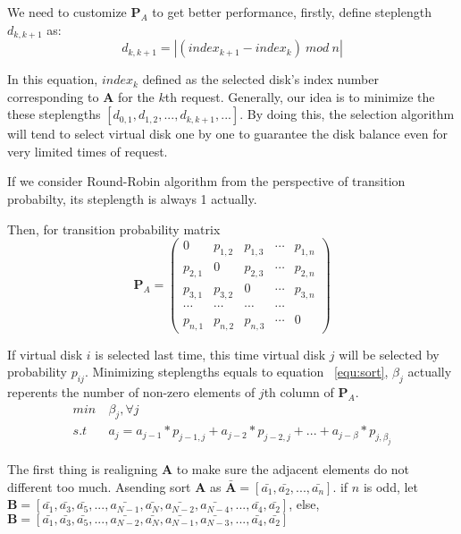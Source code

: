 \documentclass[11pt,a4paper]{article}
\begin{document}
We need to customize $\mathbf{P}_A$ to get better performance, firstly, define steplength $d_{k, k+1}$ as:
\begin{equation}
d_{k,k+1} = |(index_{k+1} - index_{k})\ mod \ n|
\label{equ:steplength}
\end{equation}

In this equation, $index_{k}$ defined as the selected disk's index number corresponding to $\mathbf{A}$ for 
the $k$th request. Generally, our idea is to minimize the these steplengths $[d_{0,1},d_{1,2},...,d_{k,k+1},...]$.
By doing this, the selection algorithm will tend to select virtual disk one by one to guarantee 
the disk balance even for very limited times of request. 

If we consider Round-Robin algorithm from the perspective of transition probabilty, its steplength is always 1 actually.

Then, for transition probability matrix
\begin{equation}
  \mathbf{P}_A = 
  \begin{pmatrix}
    0 & p_{1,2} & p_{1,3} & \cdots & p_{1,n} \\
    p_{2,1} & 0 & p_{2,3} & \cdots & p_{2,n} \\
    p_{3,1} & p_{3,2} & 0 & \cdots & p_{3,n} \\
     \cdots & \cdots & \cdots & \cdots \\
    p_{n,1} & p_{n,2} & p_{n,3} & \cdots & 0
  \end{pmatrix}
\end{equation}

If virtual disk $i$ is selected last time, this time virtual disk $j$ will 
be selected by probability $p_{ij}$. Minimizing steplengths equals to equation ~\ref{equ:sort}, $\beta_j$ actually reperents
the number of non-zero elements of $j$th column of $\mathbf{P}_A$.
\begin{equation}
  \begin{split}
  min\ & \beta_j, \forall j \\
  s.t\ & a_{j} = a_{j-1}*p_{j-1,j} + a_{j-2}*p_{j-2,j} + ... + a_{j-\beta}*p_{j,\beta_j}
\end{split}
\label{equ:sort}
\end{equation}

The first thing is realigning $\mathbf{A}$ to make sure the adjacent elements do not different too much.
Asending sort $\mathbf {A}$ as $\mathbf{\bar{A}} = [\bar{a_1},\bar{a_2},...,\bar{a_n}]$. 
if $n$ is odd, let $\mathbf{B} = [\bar{a_1},\bar{a_3},\bar{a_5},...,\bar{a_{N-1}},\bar{a_{N}},\bar{a_{N-2}},\bar{a_{N-4}},...,\bar{a_4},\bar{a_2}]$, 
else, $\mathbf{B} = [\bar{a_1},\bar{a_3},\bar{a_5},...,\bar{a_{N-2}},\bar{a_{N}},\bar{a_{N-1}},\bar{a_{N-3}},...,\bar{a_4},\bar{a_2}]$
\end{document}
